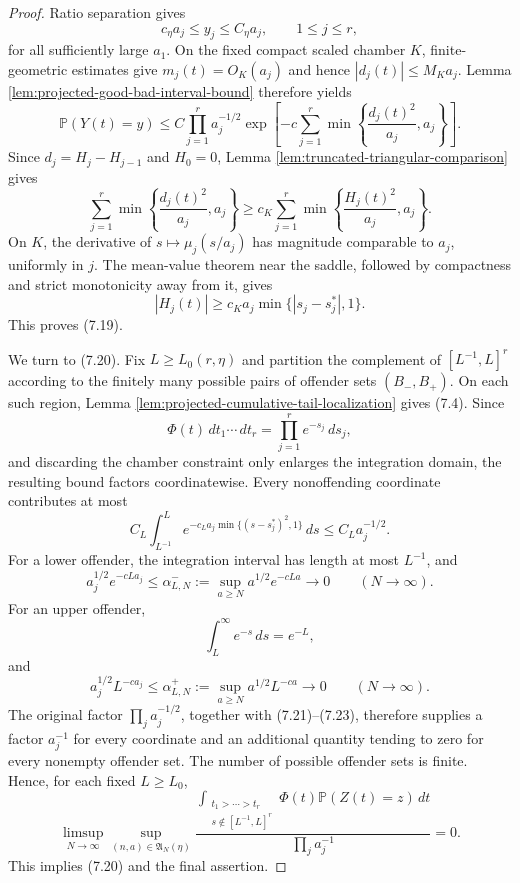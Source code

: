 \documentclass[11pt]{article}
\theoremstyle{remark}
\newcommand{\Pp}{\mathbb P}
\newcommand{\dd}{\,d}
\begin{document}
\begin{proof}
Ratio separation gives
\[
        c_\eta a_j\le y_j\le C_\eta a_j,
        \qquad 1\le j\le r,
\]
for all sufficiently large $a_1$.  On the fixed compact scaled chamber $K$,
finite-geometric estimates give $m_j(t)=O_K(a_j)$ and hence
$|d_j(t)|\le M_Ka_j$.  Lemma
\ref{lem:projected-good-bad-interval-bound} therefore yields
\[
        \Pp(Y(t)=y)
        \le C\prod_{j=1}^r a_j^{-1/2}
        \exp\left[-c\sum_{j=1}^r
        \min\left\{\frac{d_j(t)^2}{a_j},a_j\right\}\right].
\]
Since $d_j=H_j-H_{j-1}$ and $H_0=0$, Lemma
\ref{lem:truncated-triangular-comparison} gives
\[
        \sum_{j=1}^r
        \min\left\{\frac{d_j(t)^2}{a_j},a_j\right\}
        \ge c_K\sum_{j=1}^r
        \min\left\{\frac{H_j(t)^2}{a_j},a_j\right\}.
\]
On $K$, the derivative of
$s\mapsto\mu_j(s/a_j)$ has magnitude comparable to $a_j$, uniformly in $j$.
The mean-value theorem near the saddle, followed by compactness and strict
monotonicity away from it, gives
\[
        |H_j(t)|
        \ge c_Ka_j\min\{|s_j-s_j^*|,1\}.
\]
This proves (7.19).

We turn to (7.20).  Fix $L\ge L_0(r,\eta)$ and partition the complement of
$[L^{-1},L]^r$ according to the finitely many possible pairs of offender sets
$(B_-,B_+)$.  On each such region, Lemma
\ref{lem:projected-cumulative-tail-localization} gives (7.4).  Since
\[
        \Phi(t)\dd t_1\cdots\dd t_r
        =\prod_{j=1}^r e^{-s_j}\dd s_j,
\]
and discarding the chamber constraint only enlarges the integration domain,
the resulting bound factors coordinatewise.  Every nonoffending coordinate
contributes at most
\[
        C_L\int_{L^{-1}}^L
        e^{-c_La_j\min\{(s-s_j^*)^2,1\}}\dd s
        \le C_La_j^{-1/2}.
        \tag{7.21}
\]
For a lower offender, the integration interval has length at most $L^{-1}$,
and
\[
        a_j^{1/2}e^{-cLa_j}
        \le \alpha_{L,N}^-
        :=\sup_{a\ge N}a^{1/2}e^{-cLa}
        \longrightarrow0
        \qquad(N\to\infty).
        \tag{7.22}
\]
For an upper offender,
\[
        \int_L^\infty e^{-s}\dd s=e^{-L},
\]
and
\[
        a_j^{1/2}L^{-ca_j}
        \le \alpha_{L,N}^+
        :=\sup_{a\ge N}a^{1/2}L^{-ca}
        \longrightarrow0
        \qquad(N\to\infty).
        \tag{7.23}
\]
The original factor $\prod_j a_j^{-1/2}$, together with (7.21)--(7.23),
therefore supplies a factor $a_j^{-1}$ for every coordinate and an additional
quantity tending to zero for every nonempty offender set.  The number of
possible offender sets is finite.  Hence, for each fixed $L\ge L_0$,
\[
\limsup_{N\to\infty}
\sup_{(n,a)\in\mathfrak A_N(\eta)}
\frac{
\displaystyle
\int_{\substack{t_1>\cdots>t_r\\s\notin[L^{-1},L]^r}}
\Phi(t)\Pp(Z(t)=z)\dd t}
{\prod_j a_j^{-1}}=0.
\]
This implies (7.20) and the final assertion.
\end{proof}
\end{document}
